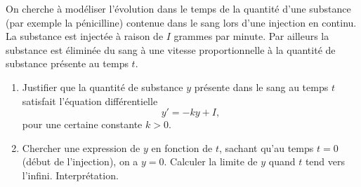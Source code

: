 
\begin{exercice}\label{exoEqsDiff0012}

On cherche à modéliser l'évolution dans le temps de la quantité d'une substance (par exemple la pénicilline) contenue dans le sang lors d'une injection en continu. La substance est injectée à raison de $I$ grammes par minute. Par ailleurs la substance est éliminée du sang à une vitesse proportionnelle à la quantité de substance présente au temps $t$.

\begin{enumerate}
\item Justifier que la quantité de substance $y$ présente dans le sang au temps $t$ satisfait l'équation différentielle \[y'=-ky+I,\] pour une certaine constante $k>0$.
\item Chercher une expression de $y$ en fonction de $t$, sachant qu'au temps $t=0$ (début de l'injection), on a $y=0$. Calculer la limite de $y$ quand $t$ tend vers l'infini. Interprétation.
\end{enumerate}

\end{exercice}
